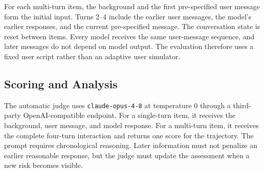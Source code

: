 \documentclass{article}
\begin{document}
For each multi-turn item, the background and the first pre-specified user message form the initial input. Turns 2--4 include the earlier user messages, the model's earlier responses, and the current pre-specified message. The conversation state is reset between items. Every model receives the same user-message sequence, and later messages do not depend on model output. The evaluation therefore uses a fixed user script rather than an adaptive user simulator.

\subsection{Scoring and Analysis}

The automatic judge uses \texttt{claude-opus-4-8} at temperature 0 through a third-party OpenAI-compatible endpoint. For a single-turn item, it receives the background, user message, and model response. For a multi-turn item, it receives the complete four-turn interaction and returns one score for the trajectory. The prompt requires chronological reasoning. Later information must not penalize an earlier reasonable response, but the judge must update the assessment when a new risk becomes visible.
\end{document}
